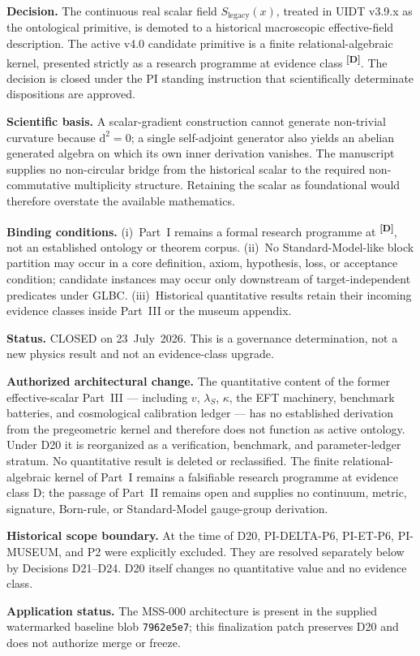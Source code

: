\documentclass[12pt,a4paper,twoside]{article}
\theoremstyle{plain}
\theoremstyle{definition}
\theoremstyle{remark}
\newcommand{\catmark}[1]{\textsuperscript{\textsf{\textbf{[#1]}}}}
\newcommand{\LegacySx}{S_{\mathrm{legacy}}(x)} %
\newcommand{\Sx}{\LegacySx} %
\begin{document}
\begin{pioverridebox}
\label{box:pi-decision-d19}
\textbf{Decision.} The continuous real scalar field $\Sx$, treated in UIDT
v3.9.x as the ontological primitive, is demoted to a historical macroscopic
effective-field description. The active v4.0 candidate primitive is a finite
relational-algebraic kernel, presented strictly as a research programme at
evidence class \catmark{D}. The decision is closed under the PI standing
instruction that scientifically determinate dispositions are approved.

\textbf{Scientific basis.} A scalar-gradient construction cannot generate
non-trivial curvature because $\mathrm d^2=0$; a single self-adjoint generator
also yields an abelian generated algebra on which its own inner derivation
vanishes. The manuscript supplies no non-circular bridge from the historical
scalar to the required non-commutative multiplicity structure. Retaining the
scalar as foundational would therefore overstate the available mathematics.

\textbf{Binding conditions.}
(i)~Part~I remains a formal research programme at \catmark{D}, not an
established ontology or theorem corpus.
(ii)~No Standard-Model-like block partition may occur in a core definition,
axiom, hypothesis, loss, or acceptance condition; candidate instances may
occur only downstream of target-independent predicates under GLBC.
(iii)~Historical quantitative results retain their incoming evidence classes
inside Part~III or the museum appendix.

\textbf{Status.} CLOSED on 23~July~2026. This is a governance determination,
not a new physics result and not an evidence-class upgrade.
\end{pioverridebox}

\begin{pioverridebox}
\label{box:pi-decision-d20}
\textbf{Authorized architectural change.} The quantitative content of the
former effective-scalar Part~III --- including $v$, $\lambda_S$, $\kappa$,
the EFT machinery, benchmark batteries, and cosmological calibration ledger
--- has no established derivation from the pregeometric kernel and therefore
does not function as active ontology. Under D20 it is reorganized as a
verification, benchmark, and parameter-ledger stratum. No quantitative result
is deleted or reclassified. The finite relational-algebraic kernel of Part~I
remains a falsifiable research programme at evidence class D; the passage of
Part~II remains open and supplies no continuum, metric, signature, Born-rule,
or Standard-Model gauge-group derivation.

\textbf{Historical scope boundary.} At the time of D20,
PI-DELTA-P6, PI-ET-P6, PI-MUSEUM, and P2 were explicitly excluded. They are
resolved separately below by Decisions D21--D24. D20 itself changes no
quantitative value and no evidence class.

\textbf{Application status.} The MSS-000 architecture is present in the
supplied watermarked baseline blob \texttt{7962e5e7}; this finalization patch
preserves D20 and does not authorize merge or freeze.
\end{pioverridebox}
\end{document}
